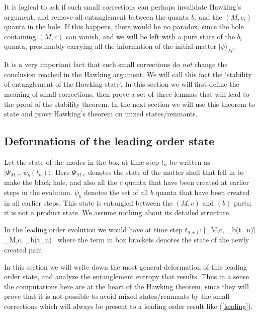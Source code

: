 \documentclass[12pt]{article}
\begin{document}
It is logical to ask if such small corrections can perhaps invalidate Hawking's argument, and remove all entanglement between the quanta $b_i$ and the $(M, c_i)$ quanta in the hole. If this happens, there would be no paradox, since the hole containing $(M,c)$ can vanish, and we will be left with a pure state of the $b_i$ quanta, presumably carrying all the information of the initial matter $|\psi\rangle_M$. 

It is a very important fact that such small corrections do {\it not} change the conclusion reached in the Hawking argument. We will call this fact the `stability of entanglement of the Hawking state'. In this section we will first define the meaning of small corrections, then prove a set of three lemmas that will  lead to the proof of the  stability theorem. In the next section we will use this theorem to state and prove Hawking's theorem on mixed states/remnants.




\subsection{Deformations of the leading order state}\label{deformation}

Let the state of the modes in the box at time step $t_n$ be written as  $|\Psi_{M, c}, \psi_{b}(t_n)\rangle$. Here $\Psi_{M,c}$ denotes the state of the matter shell that fell in to make the black hole, and also all the $c$ quanta that have been created at earlier steps in the evolution. $\psi_b$ denotes the set of all $b$ quanta that have been created in all earlier steps. This state is entangled between the $(M,c)$ and $(b)$ parts; it is not a product state. We assume nothing about its detailed structure. 

 In the leading order evolution we would have  at time step $t_{n+1}$:
\be
|\Psi_{M,c}, \psi_b(t_n)\rangle\r |\Psi_{M,c}, \psi_{b}(t_n)\rangle~
\label{leading}
\ee
where the term in box brackets denotes the state of the newly created pair. 

In this section we will write down the most general deformation of this leading order state, and analyze the entanglement entropy that results. Thus in a sense the computations here are at the heart of the Hawking theorem, since they will prove that it is not possible to avoid mixed states/remnants by the small corrections which will always be present to a leading order result like (\ref{leading}).
\end{document}
